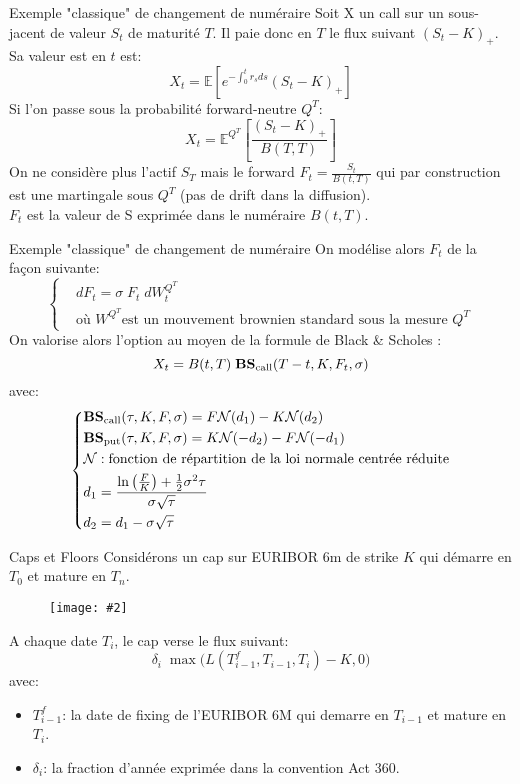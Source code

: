 \documentclass{beamer}
\newcommand{\FIG}[2]{\texttt{[image: \#2]}}
\begin{document}
\begin{frame}{Exemple "classique" de changement de numéraire}
Soit X un call sur un sous-jacent de valeur $S_t$ de maturité $T$. Il paie donc en $T$ le flux suivant $(S_t-K)_+$.\\
Sa valeur est en $t$ est:
\[
X_t=\mathbb{E}[e^{-\int_0^t r_s ds}(S_t-K)_+]
\]
Si l'on passe sous la probabilité forward-neutre $Q^T$:
\[
X_t=\mathbb{E}^{Q^T}\left[\frac{(S_t-K)_+}{B(T,T)}\right]
\]
On ne considère plus l'actif $S_T$ mais le forward $F_t=\frac{S_t}{B(t,T)}$  qui par construction est une martingale sous $Q^T$ (pas de drift dans la diffusion).\\
$F_t$ est la valeur de S exprimée dans le numéraire $B(t,T)$.
\end{frame}
\begin{frame}{Exemple "classique" de changement de numéraire}
On modélise alors $F_t$ de la façon suivante:
\[
\left\{
\begin{split}
&dF_t=\sigma\; F_t \;dW_t^{Q^T}\\
&\text{où } W^{Q^T}\text{est un mouvement brownien standard sous la mesure }Q^T
\end{split}
\right.
\]
On valorise alors l'option au moyen de la formule de Black \& Scholes :
\[
X_t=B(t,T)\;\text{\textbf{BS}}_\text{call}(T-t,K,F_t,\sigma)
\]
avec:
\[
\left\{
\begin{split}
&\text{\textbf{BS}}_\text{call}(\tau,K,F,\sigma)=F\mathcal{N}(d_1)-K \mathcal{N}(d_2)\\
&\text{\textbf{BS}}_\text{put}(\tau,K,F,\sigma)=K\mathcal{N}(-d_2)-F \mathcal{N}(-d_1)\\
&\mathcal{N} : \text{fonction de répartition de la loi normale centrée réduite}\\
&d_1=\frac{\ln\left(\frac{F}{K}\right)+\frac{1}{2}\sigma^2\tau}{\sigma\sqrt{\tau}}\\
&d_2=d_1-\sigma\sqrt{\tau}
\end{split}
\right.
\]
\end{frame}

\begin{frame}{Caps et Floors}
Considérons un cap sur EURIBOR 6m de strike $K$ qui démarre en $T_0$ et mature en $T_n$.
\begin{figure}[h]
\FIG{10cm}{figures/schema_cap.jpg}
\end{figure}
A chaque date $T_i$, le cap verse le flux suivant:
\[
\delta_i\; \max \big(L(T_{i -1}^f,T_{i -1},T_i) - K, 0\big)
\]
avec:
\begin {itemize}
\item $T_{i -1}^f$: la date de fixing de l'EURIBOR 6M qui demarre en $T_{i -1}$ et mature en $T_{i}$.
\item $\delta_i$: la fraction d'année exprimée dans la convention Act 360.
\end {itemize}
\end{frame}
\end{document}
